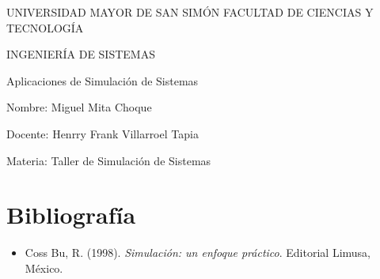 \documentclass[12pt, a4paper]{article}
\begin{document}
\setlength{\parindent}{0pt}

\begin{titlepage}
\centering
\begin{minipage}{\textwidth}
\end{minipage}
\begin{minipage}{\textwidth}
\centering
\large UNIVERSIDAD MAYOR DE SAN SIMÓN
\large FACULTAD DE CIENCIAS Y TECNOLOGÍA

\large INGENIERÍA DE SISTEMAS
\end{minipage}

\begin{minipage}{\textwidth}
\end{minipage}
\vspace{6cm}

{\huge Aplicaciones de Simulación de Sistemas}
\vfill 

\begin{flushleft}

Nombre: Miguel Mita Choque

Docente: Henrry Frank Villarroel Tapia

Materia: Taller de Simulación de Sistemas

\end{flushleft}

\end{titlepage}

\tableofcontents
\newpage

\setlength{\parskip}{10pt}



\newpage



\newpage



\newpage



\newpage

\section*{Bibliografía}

\begin{itemize}
  \item Coss Bu, R. (1998). \textit{Simulación: un enfoque práctico}. Editorial Limusa, México.
\end{itemize}
\end{document}
